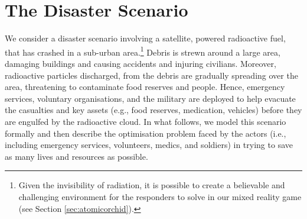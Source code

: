 \section{The Disaster Scenario}\label{sec:scenario}
\noindent We consider a disaster scenario involving a satellite, powered radioactive fuel, that has crashed in a sub-urban area.\footnote{Given the invisibility of radiation, it is possible to create a believable and challenging environment for the responders to solve in our mixed reality game (see Section \ref{sec:atomicorchid}).} Debris is strewn around a large area, damaging buildings and causing accidents and injuring civilians. Moreover, radioactive particles discharged, from the debris are gradually spreading over the area, threatening to contaminate food reserves and people. Hence, emergency services, voluntary organisations, and the military are deployed to help evacuate the casualties and key assets (e.g., food reserves, medication, vehicles) before they are engulfed by the radioactive cloud.  In what follows, we model this scenario formally and then describe the optimisation problem faced by the actors  (i.e., including emergency services, volunteers, medics, and soldiers) in trying to save as many lives and resources as possible.  


